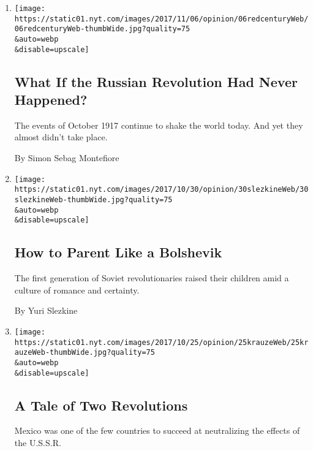 \begin{enumerate}
\def\labelenumi{\arabic{enumi}.}
\item
  \href{/2017/11/06/opinion/russian-revolution-october.html}{}

  \texttt{[image: https://static01.nyt.com/images/2017/11/06/opinion/06redcenturyWeb/06redcenturyWeb-thumbWide.jpg?quality=75\\\&auto=webp\\\&disable=upscale]}

  \hypertarget{what-if-the-russian-revolution-had-never-happened}{%
  \subsection{What If the Russian Revolution Had Never
  Happened?}\label{what-if-the-russian-revolution-had-never-happened}}

  The events of October 1917 continue to shake the world today. And yet
  they almost didn't take place.

  By Simon Sebag Montefiore
\item
  \href{/2017/10/30/opinion/how-to-parent-like-a-bolshevik.html}{}

  \texttt{[image: https://static01.nyt.com/images/2017/10/30/opinion/30slezkineWeb/30slezkineWeb-thumbWide.jpg?quality=75\\\&auto=webp\\\&disable=upscale]}

  \hypertarget{how-to-parent-like-a-bolshevik}{%
  \subsection{How to Parent Like a
  Bolshevik}\label{how-to-parent-like-a-bolshevik}}

  The first generation of Soviet revolutionaries raised their children
  amid a culture of romance and certainty.

  By Yuri Slezkine
\item
  \href{/2017/10/25/opinion/mexico-soviet-russian-revolution.html}{}

  \texttt{[image: https://static01.nyt.com/images/2017/10/25/opinion/25krauzeWeb/25krauzeWeb-thumbWide.jpg?quality=75\\\&auto=webp\\\&disable=upscale]}

  \hypertarget{a-tale-of-two-revolutions}{%
  \subsection{A Tale of Two
  Revolutions}\label{a-tale-of-two-revolutions}}

  Mexico was one of the few countries to succeed at neutralizing the
  effects of the U.S.S.R.


\end{enumerate}
